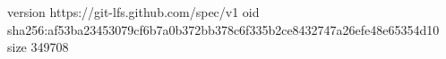 version https://git-lfs.github.com/spec/v1
oid sha256:af53ba23453079cf6b7a0b372bb378c6f335b2ce8432747a26efe48e65354d10
size 349708
